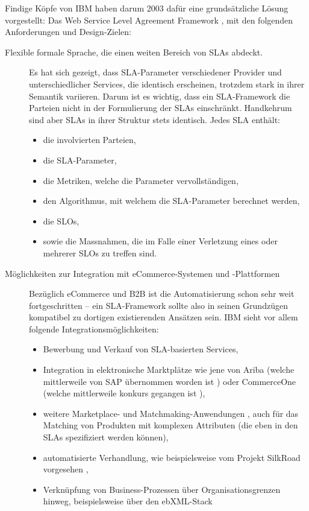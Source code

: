 \documentclass[11pt,listof=totoc]{scrreprt} %
\theoremstyle{definition}
\begin{document}
Findige Köpfe von IBM haben darum 2003 dafür eine grundsätzliche Lösung vorgestellt: Das Web Service Level Agreement Framework \cite{ibm:wslaSpec, ibm:wslaPaper}, mit den folgenden Anforderungen und Design-Zielen:
\begin{description}
\item[Flexible formale Sprache, die einen weiten Bereich von SLAs abdeckt.] Es hat sich gezeigt, dass SLA-Parameter verschiedener Provider und unterschiedlicher Services, die identisch erscheinen, trotzdem stark in ihrer Semantik variieren. Darum ist es wichtig, dass ein SLA-Framework die Parteien nicht in der Formulierung der SLAs einschränkt. Handkehrum sind aber SLAs in ihrer Struktur stets identisch. Jedes SLA enthält:
\begin{itemize}
\item die involvierten Parteien,
\item die SLA-Parameter,
\item die Metriken, welche die Parameter vervollständigen,
\item den Algorithmus, mit welchem die SLA-Parameter berechnet werden,
\item die SLOs,
\item sowie die Massnahmen, die im Falle einer Verletzung eines oder mehrerer SLOs zu treffen sind.
\end{itemize}
\item[Möglichkeiten zur Integration mit eCommerce-Systemen und -Plattformen] Bezüglich eCommerce und B2B ist die Automatisierung schon sehr weit fortgeschritten -- ein SLA-Framework sollte also in seinen Grundzügen kompatibel zu dortigen existierenden Ansätzen sein. IBM sieht vor allem folgende Integrationsmöglichkeiten:
\begin{itemize}
\item Bewerbung und Verkauf von SLA-basierten Services,
\item Integration in elektronische Marktplätze wie jene von Ariba (welche mittlerweile von SAP übernommen worden ist \cite{wiki:ariba}) oder CommerceOne (welche mittlerweile konkurs gegangen ist \cite{wiki:commerceone}),
\item weitere Marketplace- und Matchmaking-Anwendungen \cite{Bichler200106}, auch für das Matching von Produkten mit komplexen Attributen (die eben in den SLAs spezifiziert werden können),
\item automatisierte Verhandlung, wie beispielsweise vom Projekt SilkRoad vorgesehen \cite{Strobel:2001:DRP:593916.593929, Stroebel00aframework},
\item Verknüpfung von Business-Prozessen über Organisationsgrenzen hinweg, beispielsweise über den ebXML-Stack \cite{wiki:ebxml, ibm:wslaPaper}

\end{itemize}
\end{description}
\end{document}
